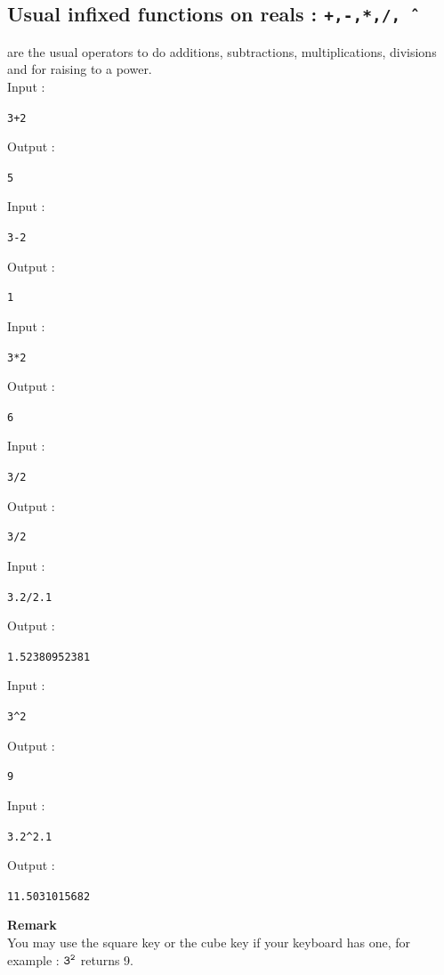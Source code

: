 \documentclass[a4paper,11pt]{book}
\begin{document}
\subsection{Usual infixed functions on reals : {\tt +,-,*,/,\^\ }}
\index{+,-,*,/,\^\ }
\noindent {\tt +,-,*,/,\^\ } are the usual operators to do
additions, subtractions, multiplications, divisions and for raising to a
power.\\
Input :
\begin{center}{\tt 3+2}\end{center}
Output :
\begin{center}{\tt 5}\end{center}
Input :
\begin{center}{\tt 3-2}\end{center}
Output :
\begin{center}{\tt 1}\end{center}
Input :
\begin{center}{\tt 3*2}\end{center}
Output :
\begin{center}{\tt 6}\end{center}
Input :
\begin{center}{\tt 3/2}\end{center}
Output :
\begin{center}{\tt 3/2}\end{center}
Input :
\begin{center}{\tt 3.2/2.1}\end{center}
Output :
\begin{center}{\tt 1.52380952381}\end{center}
Input :
\begin{center}{\tt 3\verb|^|2}\end{center}
Output :
\begin{center}{\tt 9}\end{center}
Input :
\begin{center}{\tt 3.2\verb|^|2.1}\end{center}
Output :
\begin{center}{\tt 11.5031015682}\end{center}

{\bf Remark}\\
You may use the square key or the cube key if your keyboard has one,
for example : ${\tt 3^2}$ returns 9.
\end{document}

